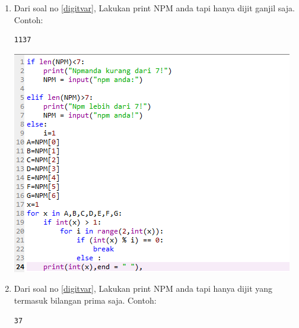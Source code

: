 \begin{enumerate}
\item
Dari soal no \ref{digitvar}, Lakukan print NPM anda tapi hanya dijit ganjil saja. Contoh:
\begin{verbatim}
1137
\end{verbatim}
    \begin{center}
        \centering
        \includegraphics[scale=0.7]{figures/chapter 2/22.PNG}
    \end{center}
\item 
Dari soal no \ref{digitvar}, Lakukan print NPM anda tapi hanya dijit yang termasuk bilangan prima saja. Contoh:
\begin{verbatim}
37
\end{verbatim}
\end{enumerate}


